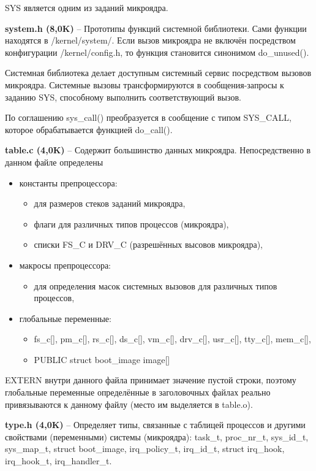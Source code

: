 SYS является одним из заданий микроядра.

\textbf{system.h (8,0K)} -- Прототипы функций системной библиотеки. Сами функции находятся в /kernel/system/. Если вызов микроядра не включён посредством конфигурации /kernel/config.h, то функция становится синонимом do\_unused().

Системная библиотека делает доступным системный сервис посредством вызовов микроядра. Системные вызовы трансформируются в сообщения-запросы к заданию SYS, способному выполнить соответствующий
вызов.

По соглашению sys\_call() преобразуется в сообщение с типом SYS\_CALL, которое обрабатывается функцией do\_call().

\textbf{table.c (4,0K)} -- Содержит большинство данных микроядра. Непосредственно в данном файле определены
\begin{itemize}
\item константы препроцессора:
\begin{itemize}
\item для размеров стеков заданий микроядра,
\item флаги для различных типов процессов (микроядра),
\item списки FS\_C и DRV\_C (разрешённых высовов микроядра),
\end{itemize}
\item макросы препроцессора:
\begin{itemize}
\item для определения масок системных вызовов для различных типов процессов,
\end{itemize}
\item глобальные переменные:
\begin{itemize}
\item fs\_c[], pm\_c[], rs\_c[], ds\_c[], vm\_c[], drv\_c[], usr\_c[], tty\_c[], mem\_c[],
\item PUBLIC struct boot\_image image[]
\end{itemize}
\end{itemize}

EXTERN внутри данного файла принимает значение пустой строки, поэтому глобальные переменные определённые в заголовочных файлах реально привязываются к данному файлу (место им выделяется в table.o).

\textbf{type.h (4,0K)} -- Определяет типы, связанные с таблицей процессов и другими свойствами (переменными) системы (микроядра): task\_t, proc\_nr\_t, sys\_id\_t, sys\_map\_t, struct boot\_image, irq\_policy\_t, irq\_id\_t, struct irq\_hook, irq\_hook\_t, irq\_handler\_t.

